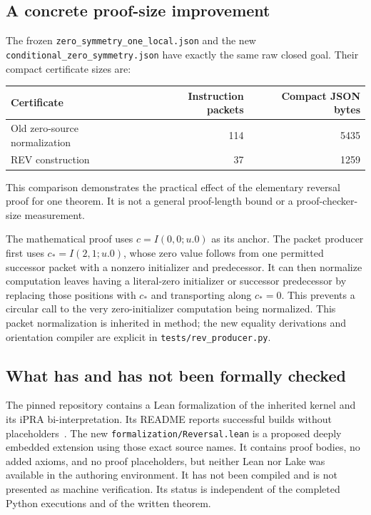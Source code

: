 \documentclass[11pt,letterpaper]{article}
\theoremstyle{definition}\newtheorem{definition}[theorem]{Definition}
\theoremstyle{remark}\newtheorem{remark}[theorem]{Remark}
\newcommand{\code}[1]{{\small\nolinkurl{#1}}}
\begin{document}
\subsection{A concrete proof-size improvement}

The frozen \code{zero_symmetry_one_local.json} and the new
\code{conditional_zero_symmetry.json} have exactly the same raw closed
goal. Their compact certificate sizes are:
\begin{center}\small
\begin{tabular}{@{}lrr@{}}
\toprule
Certificate & Instruction packets & Compact JSON bytes\\
\midrule
Old zero-source normalization & 114 & 5435\\
REV construction & 37 & 1259\\
\bottomrule
\end{tabular}
\end{center}
This comparison demonstrates the practical effect of the elementary
reversal proof for one theorem. It is not a general proof-length bound
or a proof-checker-size measurement.

The mathematical proof uses $c=I(0,0;u.0)$ as its anchor. The packet
producer first uses $c_*=I(2,1;u.0)$, whose zero value follows from one
permitted successor packet with a nonzero initializer and predecessor.
It can then normalize computation leaves having a literal-zero
initializer or successor predecessor by replacing those positions with
$c_*$ and transporting along $c_*=0$. This prevents a circular call to
the very zero-initializer computation being normalized. This packet
normalization is inherited in method; the new equality derivations and
orientation compiler are explicit in \code{tests/rev_producer.py}.

\subsection{What has and has not been formally checked}

The pinned repository contains a Lean formalization of the inherited
kernel and its iPRA bi-interpretation. Its README reports successful
builds without placeholders~\cite{baseline,leanbridge}. The new
\code{formalization/Reversal.lean} is a proposed deeply embedded
extension using those exact source names. It contains proof bodies,
no added axioms, and no proof placeholders, but neither Lean nor Lake
was available in the authoring environment. It has not been compiled
and is not presented as machine verification. Its status is independent
of the completed Python executions and of the written theorem.
\end{document}
